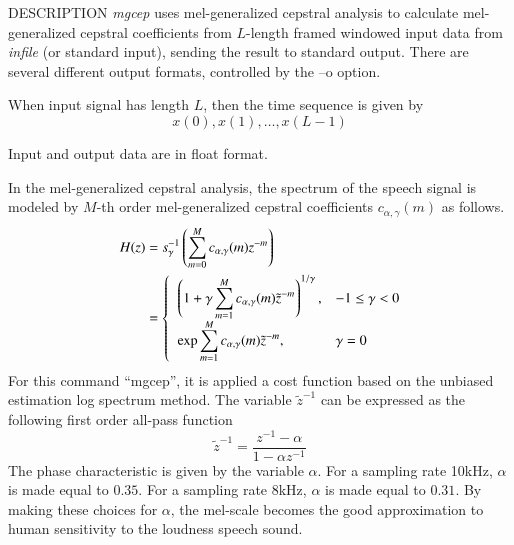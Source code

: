 \begin{synopsis}
\item[mgcep]   [ --a $A$ ] [ --g $G$ ] [ --c $C$ ] [ --m $M$ ] [ --l $L$ ] 
               [ --q $Q$ ] [ --o $O$ ]
\item[\ ~~~~~~~] [ --i $I$ ] [ --j $J$ ] [ --d $D$ ] [ --p $P$ ] [ -- e $E$ ] [ --f $F$ ] 
                 [ {\em infile} ]
\end{synopsis}

\begin{qsection}{DESCRIPTION}
{\em mgcep} uses mel-generalized cepstral analysis 
to calculate mel-generalized cepstral coefficients 
from $L$-length framed windowed input data 
from {\em infile} (or standard input), 
sending the result to standard output. 
There are several different output formats,
controlled by the --o option.

When input signal has length $L$,
then the time sequence is given by
\begin{displaymath}
  x(0),x(1),\dots,x(L-1)
\end{displaymath}

Input and output data are in float format.

In the mel-generalized cepstral analysis, the spectrum of the speech signal
is modeled by $M$-th order mel-generalized cepstral
coefficients $c_{\alpha, \gamma}(m)$
as follows.
\begin{align}
H(z) &= s_\gamma^{-1}\left(
        \sum_{m=0}^M c_{\alpha, \gamma}(m)z^{-m} \right) \notag \\
     &= \begin{cases} \;\; \displaystyle
        \left( 1+\gamma\sum_{m=1}^M c_{\alpha, \gamma}(m)\tilde{z}^{-m}
                \right)^{1/\gamma}, & -1 \leq \gamma < 0 \\
        \;\; \displaystyle \exp \sum_{m=1}^M c_{\alpha, \gamma}(m)\tilde{z}^{-m}, 
                & \gamma=0
        \end{cases} \notag
\end{align}
For this command ``mgcep'', it is applied a cost function
based on the unbiased estimation log spectrum method.
The variable $\tilde{z}^{-1}$ can be expressed as the following
first order all-pass function
\begin{displaymath}
\tilde{z}^{-1} = \frac{z^{-1}-\alpha}{1-\alpha z^{-1}}
\end{displaymath}
The phase characteristic is given by the variable $\alpha$.
For a sampling rate 10kHz, $\alpha$ is made equal to $0.35$.
For a sampling rate 8kHz, $\alpha$ is made equal to $0.31$.
By making these choices for $\alpha$,
the mel-scale becomes the good approximation to human
sensitivity to the loudness speech sound.


\end{qsection}
